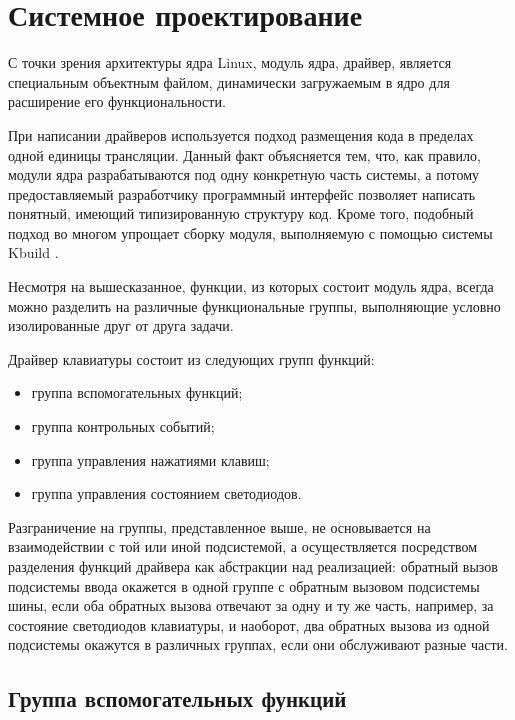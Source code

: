 \section{Системное проектирование} \label{system-design}

С точки зрения архитектуры ядра Linux, модуль ядра, драйвер, является специальным объектным файлом, 
динамически загружаемым в ядро для расширение его функциональности. 

При написании драйверов используется подход размещения кода в пределах одной единицы трансляции. 
Данный факт объясняется тем,
что, как правило, модули ядра разрабатываются под одну конкретную часть системы, а потому предоставляемый разработчику
программный интерфейс позволяет написать понятный, имеющий типизированную структуру код.
Кроме того, подобный подход во многом упрощает сборку модуля,
выполняемую с помощью системы Kbuild \cite{kbuild}.

Несмотря на вышесказанное, функции, из которых состоит модуль ядра,
всегда можно разделить на различные функциональные группы, выполняющие
условно изолированные друг от друга задачи.

Драйвер клавиатуры состоит из следующих групп функций:
\begin{itemize}
    \item группа вспомогательных функций;
    \item группа контрольных событий;
    \item группа управления нажатиями клавиш;
    \item группа управления состоянием светодиодов.
\end{itemize}

Разграничение на группы, представленное выше, не основывается на взаимодействии
с той или иной подсистемой, а осуществляется посредством разделения
функций драйвера как абстракции над реализацией: обратный вызов подсистемы
ввода окажется в одной группе с обратным вызовом подсистемы шины,
если оба обратных вызова отвечают за одну и ту же часть, например, 
за состояние светодиодов клавиатуры, и наоборот, два обратных вызова из одной подсистемы
окажутся в различных группах, если они обслуживают разные части.


\subsection{Группа вспомогательных функций}

